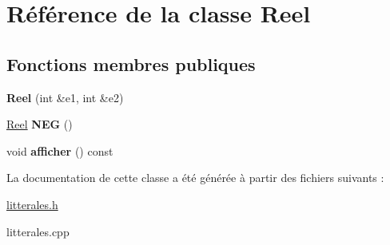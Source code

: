 \hypertarget{class_reel}{\section{Référence de la classe Reel}
\label{class_reel}
}
\subsection*{Fonctions membres publiques}
\begin{DoxyCompactItemize}
\item 
\hypertarget{class_reel_a7b4ed5a61860cf25f8f1a7564aa7b2d6}{{\bfseries Reel} (int \&e1, int \&e2)}\label{class_reel_a7b4ed5a61860cf25f8f1a7564aa7b2d6}

\item 
\hypertarget{class_reel_a2087e4e9a93f317feecf3a2caf9e8040}{\hyperlink{class_reel}{Reel} {\bfseries N\-E\-G} ()}\label{class_reel_a2087e4e9a93f317feecf3a2caf9e8040}

\item 
\hypertarget{class_reel_afd4997bab98801bf910db2850d0f632c}{void {\bfseries afficher} () const }\label{class_reel_afd4997bab98801bf910db2850d0f632c}

\end{DoxyCompactItemize}


La documentation de cette classe a été générée à partir des fichiers suivants \-:\begin{DoxyCompactItemize}
\item 
\hyperlink{litterales_8h}{litterales.\-h}\item 
litterales.\-cpp\end{DoxyCompactItemize}
